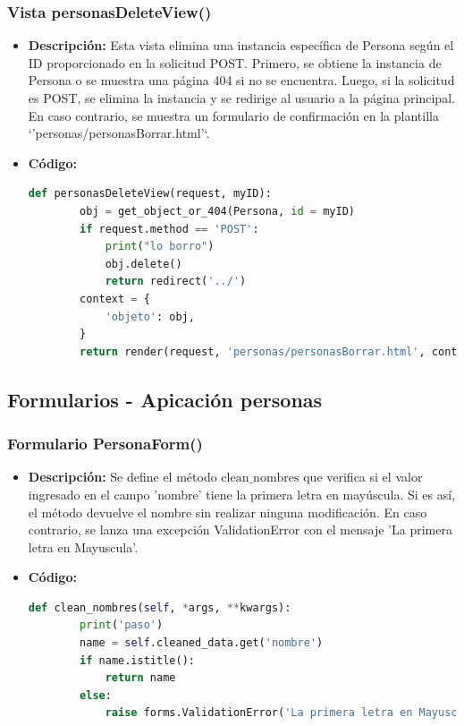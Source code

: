 \documentclass{article}
\begin{document}
  
  \subsubsection{Vista personasDeleteView()}
  \begin{itemize}
    \item \textbf{Descripción: }Esta vista elimina una instancia específica de Persona según el ID proporcionado en la solicitud POST. 
    Primero, se obtiene la instancia de Persona o se muestra una página 404 si no se encuentra. Luego, si la solicitud es POST, se elimina 
    la instancia y se redirige al usuario a la página principal. En caso contrario, se muestra un formulario de confirmación en la plantilla 
    `'personas/personasBorrar.html'`.
    \item \textbf{Código: }
    \begin{lstlisting}[language=Python]
      def personasDeleteView(request, myID):
        obj = get_object_or_404(Persona, id = myID)
        if request.method == 'POST':
            print("lo borro")
            obj.delete()
            return redirect('../')
        context = {
            'objeto': obj,
        }
        return render(request, 'personas/personasBorrar.html', context)
    \end{lstlisting}   
  \end{itemize}
  

  \subsection{Formularios - Apicación personas}
  
  
  \subsubsection{Formulario PersonaForm()}
  \begin{itemize}
    \item \textbf{Descripción: }Se define el método $\text{clean\_nombres}$ que verifica si el valor ingresado en el campo 'nombre' tiene 
    la primera letra en mayúscula. Si es así, el método devuelve el nombre sin realizar ninguna modificación. En caso contrario, 
    se lanza una excepción ValidationError con el mensaje 'La primera letra en Mayuscula'.
    \newpage
    \item \textbf{Código: }
    \begin{lstlisting}[language=Python]
      def clean_nombres(self, *args, **kwargs):
        print('paso')
        name = self.cleaned_data.get('nombre')
        if name.istitle():
            return name
        else:
            raise forms.ValidationError('La primera letra en Mayuscula')
    \end{lstlisting}   
  \end{itemize}
  
\end{document}
